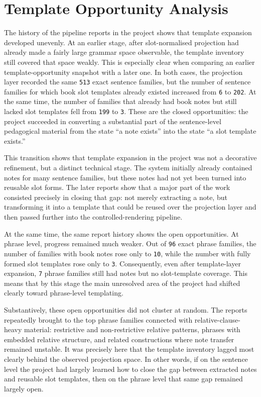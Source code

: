 \documentclass[12pt,a4paper,oneside]{report}
\begin{document}
\section{Template Opportunity Analysis}
The history of the pipeline reports in the project shows that template expansion developed unevenly. At an earlier stage, after slot-normalised projection had already made a fairly large grammar space observable, the template inventory still covered that space weakly. This is especially clear when comparing an earlier template-opportunity snapshot with a later one. In both cases, the projection layer recorded the same \texttt{513} exact sentence families, but the number of sentence families for which book slot templates already existed increased from \texttt{6} to \texttt{202}. At the same time, the number of families that already had book notes but still lacked slot templates fell from \texttt{199} to \texttt{3}. These are the closed opportunities: the project succeeded in converting a substantial part of the sentence-level pedagogical material from the state ``a note exists'' into the state ``a slot template exists.''

This transition shows that template expansion in the project was not a decorative refinement, but a distinct technical stage. The system initially already contained notes for many sentence families, but these notes had not yet been turned into reusable slot forms. The later reports show that a major part of the work consisted precisely in closing that gap: not merely extracting a note, but transforming it into a template that could be reused over the projection layer and then passed further into the controlled-rendering pipeline.

At the same time, the same report history shows the open opportunities. At phrase level, progress remained much weaker. Out of \texttt{96} exact phrase families, the number of families with book notes rose only to \texttt{10}, while the number with fully formed slot templates rose only to \texttt{3}. Consequently, even after template-layer expansion, \texttt{7} phrase families still had notes but no slot-template coverage. This means that by this stage the main unresolved area of the project had shifted clearly toward phrase-level templating.

Substantively, these open opportunities did not cluster at random. The reports repeatedly brought to the top phrase families connected with relative-clause-heavy material: restrictive and non-restrictive relative patterns, phrases with embedded relative structure, and related constructions where note transfer remained unstable. It was precisely here that the template inventory lagged most clearly behind the observed projection space. In other words, if on the sentence level the project had largely learned how to close the gap between extracted notes and reusable slot templates, then on the phrase level that same gap remained largely open.
\end{document}
